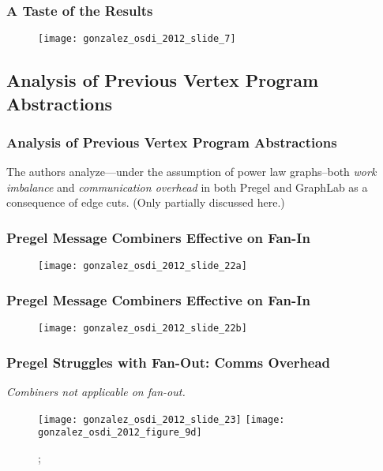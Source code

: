 \begin{frame}
  \frametitle{A Taste of the Results}
  \begin{figure}
    \centering
    \texttt{[image: gonzalez\_osdi\_2012\_slide\_7]}
    \caption{\cite[OSDI '12 Slides]{gonzalez2012powergraph-slides}}
  \end{figure}
\end{frame}


\subsection{Analysis of Previous Vertex Program Abstractions}

\begin{frame}
  \frametitle{Analysis of Previous Vertex Program Abstractions}
  The authors analyze---under the assumption of power law graphs--both
  \textit{work imbalance} and \textit{communication overhead} in both Pregel and
  GraphLab as a consequence of edge cuts. (Only partially discussed here.)
\end{frame}

\begin{frame}
  \frametitle{Pregel Message Combiners Effective on Fan-In}
  \begin{figure}
    \centering
    \texttt{[image: gonzalez\_osdi\_2012\_slide\_22a]}
    \caption{\cite[OSDI '12 Slides]{gonzalez2012powergraph-slides}}
  \end{figure}
\end{frame}

\begin{frame}
  \frametitle{Pregel Message Combiners Effective on Fan-In}
  \begin{figure}
    \centering
    \texttt{[image: gonzalez\_osdi\_2012\_slide\_22b]}
    \caption{\cite[OSDI '12 Slides]{gonzalez2012powergraph-slides}}
  \end{figure}
\end{frame}

\begin{frame}
  \frametitle{Pregel Struggles with Fan-Out: Comms Overhead}
  \centering
  \large{\textit{Combiners not applicable on fan-out.}}
  \begin{figure}
    \texttt{[image: gonzalez\_osdi\_2012\_slide\_23]}
    \texttt{[image: gonzalez\_osdi\_2012\_figure\_9d]}
    \caption{\cite[OSDI '12 Slides]{gonzalez2012powergraph-slides};
    \cite[OSDI '12]{gonzalez2012powergraph}}
  \end{figure}
\end{frame}

